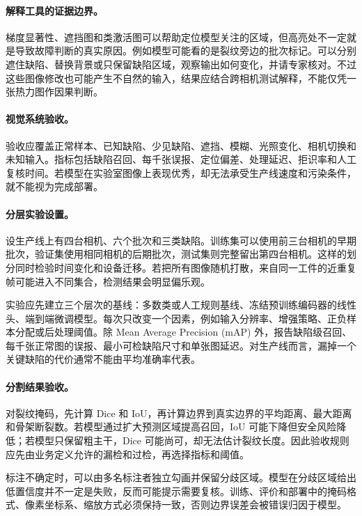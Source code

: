 \paragraph{解释工具的证据边界。}
梯度显著性、遮挡图和类激活图可以帮助定位模型关注的区域，但高亮处不一定就是导致故障判断的真实原因。例如模型可能看的是裂纹旁边的批次标记。可以分别遮住缺陷、替换背景或只保留缺陷区域，观察输出如何变化，并请专家核对。不过这些图像修改也可能产生不自然的输入，结果应结合跨相机测试解释，不能仅凭一张热力图作因果判断。

\paragraph{视觉系统验收。}
验收应覆盖正常样本、已知缺陷、少见缺陷、遮挡、模糊、光照变化、相机切换和未知输入。指标包括缺陷召回、每千张误报、定位偏差、处理延迟、拒识率和人工复核时间。若模型在实验室图像上表现优秀，却无法承受生产线速度和污染条件，就不能视为完成部署。

\paragraph{分层实验设置。}
设生产线上有四台相机、六个批次和三类缺陷。训练集可以使用前三台相机的早期批次，验证集使用相同相机的后期批次，测试集则完整留出第四台相机。这样的划分同时检验时间变化和设备迁移。若把所有图像随机打散，来自同一工件的近重复帧可能进入不同集合，检测结果会明显偏乐观。

实验应先建立三个层次的基线：多数类或人工规则基线、冻结预训练编码器的线性头、端到端微调模型。每次只改变一个因素，例如输入分辨率、增强策略、正负样本分配或后处理阈值。除 Mean Average Precision (mAP) 外，报告缺陷级召回、每千张正常图的误报、最小可检缺陷尺寸和单张图延迟。对生产线而言，漏掉一个关键缺陷的代价通常不能由平均准确率代表。

\paragraph{分割结果验收。}
对裂纹掩码，先计算 Dice 和 IoU，再计算边界到真实边界的平均距离、最大距离和骨架断裂数。若模型通过扩大预测区域提高召回，IoU 可能下降但安全风险降低；若模型只保留粗主干，Dice 可能尚可，却无法估计裂纹长度。因此验收规则应先由业务定义允许的漏检和过检，再选择指标和阈值。

标注不确定时，可以由多名标注者独立勾画并保留分歧区域。模型在分歧区域给出低置信度并不一定是失败，反而可能提示需要复核。训练、评价和部署中的掩码格式、像素坐标系、缩放方式必须保持一致，否则边界误差会被错误归因于模型。

